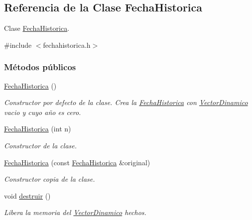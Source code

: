 \hypertarget{classFechaHistorica}{}\subsection{Referencia de la Clase Fecha\+Historica}
\label{classFechaHistorica}


Clase \hyperlink{classFechaHistorica}{Fecha\+Historica}.  




{\ttfamily \#include $<$fechahistorica.\+h$>$}

\subsubsection*{Métodos públicos}
\begin{DoxyCompactItemize}
\item 
\mbox{\label{classFechaHistorica_a35baa09e365240e567049a7e33a7c209}} 
\hyperlink{classFechaHistorica_a35baa09e365240e567049a7e33a7c209}{Fecha\+Historica} ()
\begin{DoxyCompactList}\small\item\em Constructor por defecto de la clase. Crea la {\ttfamily \hyperlink{classFechaHistorica}{Fecha\+Historica}} con {\ttfamily \hyperlink{classVectorDinamico}{Vector\+Dinamico}} vacio y cuyo año es cero. \end{DoxyCompactList}\item 
\hyperlink{classFechaHistorica_a75cf8b0edc178f4a754a467a603c7497}{Fecha\+Historica} (int n)
\begin{DoxyCompactList}\small\item\em Constructor de la clase. \end{DoxyCompactList}\item 
\hyperlink{classFechaHistorica_ac3c98da589965eb116c2b581bfd77a4f}{Fecha\+Historica} (const \hyperlink{classFechaHistorica}{Fecha\+Historica} \&original)
\begin{DoxyCompactList}\small\item\em Constructor copia de la clase. \end{DoxyCompactList}\item 
\mbox{\label{classFechaHistorica_a46401a0ca989480d0daa9deefc352b54}} 
void \hyperlink{classFechaHistorica_a46401a0ca989480d0daa9deefc352b54}{destruir} ()
\begin{DoxyCompactList}\small\item\em Libera la memoria del {\ttfamily \hyperlink{classVectorDinamico}{Vector\+Dinamico}} hechos. \end{DoxyCompactList}\item 

\end{DoxyCompactItemize}
